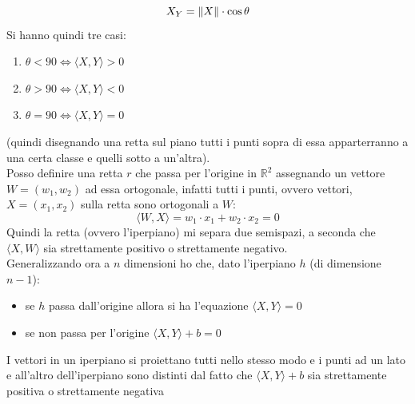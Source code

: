 \begin{shaded}
									      			      				\[X_Y=\norm{X}\cdot \cos\theta\]
									      			      				Si hanno quindi tre casi:
									      			      				\begin{enumerate}
									      			      					\item $\theta < 90 \iff \langle X, Y\rangle >0$
									      			      					\item $\theta > 90 \iff \langle X, Y\rangle <0$
									      			      					\item $\theta = 90 \iff \langle X, Y\rangle =0$
									      			      				\end{enumerate}
									      			      				(quindi disegnando una retta sul piano tutti i punti sopra di essa
									      			      				apparterranno a una certa classe e quelli sotto a un'altra).\\
									      			      				Posso definire una retta $r$ che passa per l'origine in  $\mathbb{R}^2$
									      			      				assegnando un vettore $W=(w_1, w_2)$ ad essa ortogonale, infatti tutti i punti,
									      			      				ovvero vettori, $X=(x_1, x_2)$ sulla retta sono ortogonali a $W$:
									      			      				\[\langle W, X\rangle=w_1\cdot x_1+w_2\cdot x_2=0 \]
									      			      				Quindi la retta (ovvero l'iperpiano) mi separa due semispazi, a seconda che
									      			      				$\langle X, W\rangle$ sia strettamente positivo o strettamente negativo.\\
									      			      				Generalizzando ora a $n$ dimensioni ho che, dato l'iperpiano $h$ (di
									      			      				dimensione $n-1$):
									      			      				\begin{itemize}
									      			      					\item se $h$ passa dall'origine allora si ha l'equazione $\langle X, Y\rangle
									      			      					      =0$
									      			      					\item se non passa per l'origine $\langle X, Y\rangle +b=0$ 
									      			      					          
									      			      				\end{itemize}
									      			      				I vettori in un iperpiano si proiettano tutti nello stesso modo e i punti ad
									      			      				un lato e all'altro dell'iperpiano sono distinti dal fatto che $\langle
									      			      				X, Y\rangle +b$ sia strettamente positiva o strettamente negativa
									      			      				\end{shaded}
